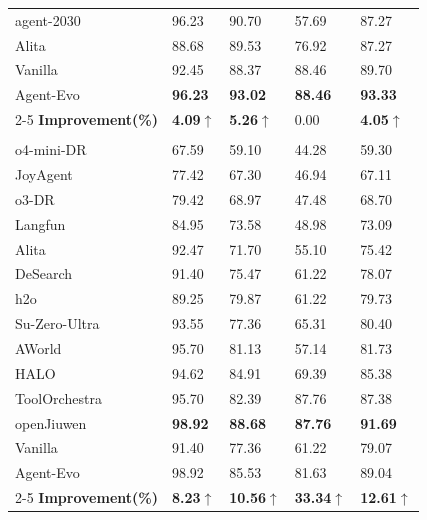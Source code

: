 \documentclass{article}
\theoremstyle{plain}
\theoremstyle{definition}
\theoremstyle{remark}
\begin{document}
\begin{table}[h]
\begin{minipage}[t]{0.5\textwidth}
\begin{tabular}{p{2.8cm}p{0.8cm}p{0.8cm}p{0.8cm}p{0.8cm}}
agent-2030                               & 96.23 & 90.70 & 57.69 & 87.27 \\
Alita~\citep{qiu2025alita}              & 88.68 & 89.53 & 76.92 & 87.27 \\
\midrule
Vanilla                                  & 92.45 & 88.37 & 88.46 & 89.70 \\
Agent-Evo                             & \textbf{96.23} & \textbf{93.02} & \textbf{88.46} & \textbf{93.33} \\
\cmidrule{2-5}
\textbf{Improvement(\%)} & \textbf{4.09$\uparrow$} & \textbf{5.26$\uparrow$} & 0.00 & \textbf{4.05$\uparrow$} \\
\midrule

\rowcolor{gray!15} \multicolumn{5}{c}{\textit{\textbf{Test}}} \\
o4-mini-DR~\citep{openai2025deepresearch} & 67.59 & 59.10 & 44.28 & 59.30 \\
JoyAgent~\citep{liu2025joyagent}          & 77.42 & 67.30 & 46.94 & 67.11 \\
o3-DR~\citep{openai2025deepresearch}      & 79.42 & 68.97 & 47.48 & 68.70 \\
Langfun~\citep{google2024langfun}         & 84.95 & 73.58 & 48.98 & 73.09 \\
Alita~\citep{qiu2025alita}               & 92.47 & 71.70 & 55.10 & 75.42 \\
DeSearch~\citep{desearchai2024desearch}   & 91.40 & 75.47 & 61.22 & 78.07 \\
h2o~\citep{h2oai2025h2ogpte}             & 89.25 & 79.87 & 61.22 & 79.73 \\
Su-Zero-Ultra                             & 93.55 & 77.36 & 65.31 & 80.40 \\
AWorld~\citep{yu2025aworld}              & 95.70 & 81.13 & 57.14 & 81.73 \\
HALO~\citep{hou2025halo}                 & 94.62 & 84.91 & 69.39 & 85.38 \\
ToolOrchestra~\citep{su2025toolorchestra} & 95.70 & 82.39 & 87.76 & 87.38 \\
openJiuwen~\citep{openjiuwen2025}        & \textbf{98.92} & \textbf{88.68} & \textbf{87.76} & \textbf{91.69} \\
\midrule
Vanilla                                  & 91.40 & 77.36 & 61.22 & 79.07 \\
Agent-Evo                             & 98.92 & 85.53 & 81.63 & 89.04 \\
\cmidrule{2-5}
\textbf{Improvement(\%)} & \textbf{8.23$\uparrow$} & \textbf{10.56$\uparrow$} & \textbf{33.34$\uparrow$} & \textbf{12.61$\uparrow$} \\

\end{tabular}
\end{minipage}
\end{table}
\end{document}
